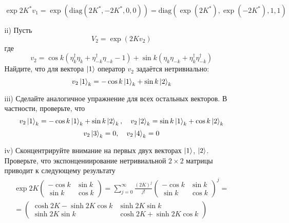 \documentclass[12pt]{article}
\theoremstyle{definition}
\begin{document}
\begin{enumerate}
\begin{itemize}
        \begin{equation}
            \exp2K^*v_1=\exp(\text{diag}(2K^*,-2K^*,0,0))=\text{diag}(\exp(2K^*),\exp(-2K^*),1,1)
        \end{equation}
        \item[ii)] Пусть
        \begin{equation}
            V_2=\exp(2Kv_2)
        \end{equation}
        где
        \begin{equation}
            v_2=\cos k(\eta^\dagger_k\eta_k+\eta^\dagger_{-k}\eta_{-k}-1)+\sin k(\eta_k\eta_{-k}+\eta^\dagger_k\eta_{-k}^\dagger)
        \end{equation}
        Найдите, что для вектора $\ket{1}$ оператор $v_2$ задаётся нетривиально:
        \begin{equation}
            v_2\ket{1}_k=-\cos k\ket{1}_k+\sin k\ket{2}_k
        \end{equation}
        \item[iii)] Сделайте аналогичное упражнение для всех остальных векторов. В частности, проверьте, что
        \begin{equation}
            v_2\ket{1}_k=-\cos k\ket{1}_k+\sin k\ket{2}_k,\quad v_2\ket{2}_k=\sin k\ket{1}_k+\cos k\ket{2}_k
        \end{equation}
        \begin{equation}
            v_2\ket{3}_k=0,\quad v_2\ket{4}_k=0
        \end{equation}
        \item[iv)] Сконцентрируйте внимание на первых двух векторах $\ket{1}$, $\ket{2}$. Проверьте, что экспонцениирование нетривиальной $2\times2$ матрицы приводит к следующему результату
        \begin{multline}
            \exp2K\begin{pmatrix}
                -\cos k &\sin k\\
                \sin k & \cos k
            \end{pmatrix}=\sum\limits_{j=0}^\infty\frac{(2K)^j}{j!}\begin{pmatrix}
                -\cos k &\sin k\\
                \sin k & \cos k
            \end{pmatrix}^j=\\=\begin{pmatrix}
                \cosh 2K-\sinh2K\cos k & \sinh2K\sin k\\
                \sinh2K\sin k & \cosh 2K+\sinh2K\cos k

\end{pmatrix}
\end{multline}
\end{itemize}
\end{enumerate}
\end{document}
